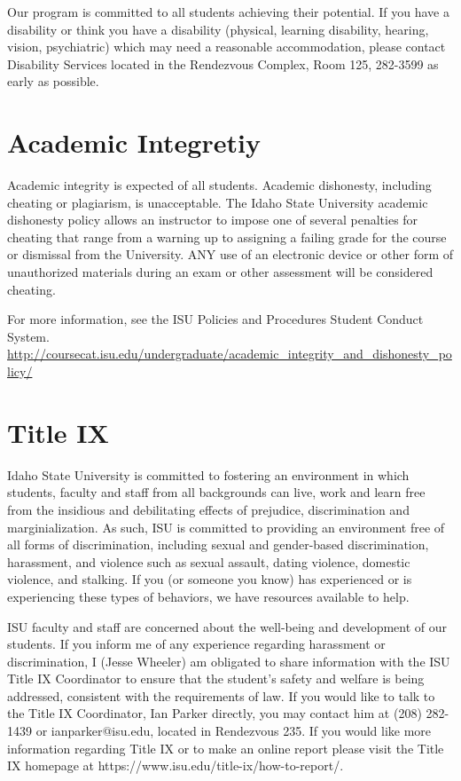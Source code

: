 \documentclass[11pt]{article}\usepackage[]{graphicx}\usepackage[]{xcolor}
\begin{document}
Our program is committed to all students achieving their potential. 
If you have a disability or think you have a disability (physical, learning disability, hearing, vision, psychiatric) which may need a reasonable accommodation, please contact Disability Services located in the Rendezvous Complex, Room 125, 282-3599 as early as possible.

\section{Academic Integretiy}

Academic integrity is expected of all students. Academic dishonesty, including cheating or plagiarism, is unacceptable. 
The Idaho State University academic dishonesty policy allows an instructor to impose one of several penalties for cheating that range from a warning up to assigning a failing grade for the course or dismissal from the University. 
ANY use of an electronic device or other form of unauthorized materials during an exam or other assessment will be considered cheating. 

For more information, see the ISU Policies and Procedures Student Conduct System.
\url{http://coursecat.isu.edu/undergraduate/academic\_integrity\_and\_dishonesty\_policy/}


\section{Title IX}

Idaho State University is committed to fostering an environment in which students, faculty and staff from all backgrounds can live, work and learn free from the insidious and debilitating effects of prejudice, discrimination and marginialization.
As such, ISU is committed to providing an environment free of all forms of discrimination, including sexual and gender-based discrimination, harassment, and violence such as sexual assault, dating violence, domestic violence, and stalking.
If you (or someone you know) has experienced or is experiencing these types of behaviors, we have resources available to help.  

ISU faculty and staff are concerned about the well-being and development of our students. 
If you inform me of any experience regarding harassment or discrimination, I (Jesse Wheeler) am obligated to share information with the ISU Title IX Coordinator to ensure that the student’s safety and welfare is being addressed, consistent with the requirements of law.
If you would like to talk to the Title IX Coordinator, Ian Parker directly, you may contact him at (208) 282-1439 or ianparker@isu.edu, located in Rendezvous 235.
If you would like more information regarding Title IX or to make an online report please visit the Title IX homepage at https://www.isu.edu/title-ix/how-to-report/.
\end{document}

